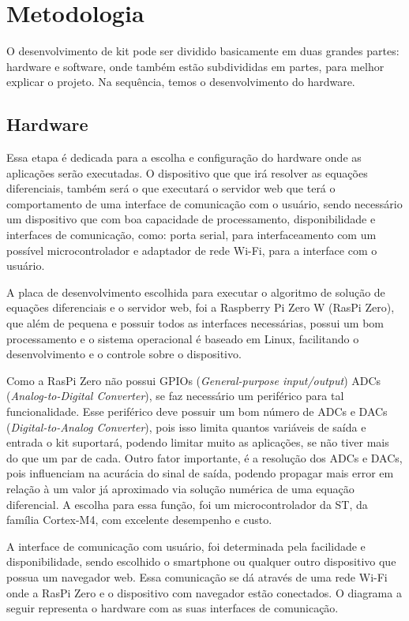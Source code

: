 \documentclass[journal]{IEEEtranTIE}
\begin{document}

\section{Metodologia}

O desenvolvimento de kit pode ser dividido basicamente em duas grandes partes: hardware e software, onde também estão subdivididas em partes, para melhor explicar o projeto. Na sequência, temos o desenvolvimento do hardware.

\subsection{Hardware}

Essa etapa é dedicada para a escolha e configuração do hardware onde as aplicações serão executadas. O dispositivo que que irá resolver as equações diferenciais, também será o que executará o servidor web que terá o comportamento de uma interface de comunicação com o usuário, sendo necessário um dispositivo que com boa capacidade de processamento, disponibilidade e interfaces de comunicação, como: porta serial, para interfaceamento com um possível microcontrolador e adaptador de rede Wi-Fi, para a interface com o usuário.

A placa de desenvolvimento escolhida para executar o algoritmo de solução de equações diferenciais e o servidor web, foi a Raspberry Pi Zero W (RasPi Zero), que além de pequena e possuir todos as interfaces necessárias, possui um bom processamento e o sistema operacional é baseado em Linux, facilitando o desenvolvimento e o controle sobre o dispositivo.

Como a RasPi Zero não possui GPIOs (\textit{General-purpose input/output}) ADCs (\textit{Analog-to-Digital Converter}), se faz necessário um periférico para tal funcionalidade. Esse periférico deve possuir um bom número de ADCs e DACs (\textit{Digital-to-Analog Converter}), pois isso limita quantos variáveis de saída e entrada o kit suportará, podendo limitar muito as aplicações, se não tiver mais do que um par de cada. Outro fator importante, é a resolução dos ADCs e DACs, pois influenciam na acurácia do sinal de saída, podendo propagar mais error em relação à um valor já aproximado via solução numérica de uma equação diferencial. A escolha para essa função, foi um microcontrolador da ST, da família Cortex-M4, com excelente desempenho e custo.

A interface de comunicação com usuário, foi determinada pela facilidade e disponibilidade, sendo escolhido o smartphone ou qualquer outro dispositivo que possua um navegador web. Essa comunicação se dá através de uma rede Wi-Fi onde a RasPi Zero e o dispositivo com navegador estão conectados. O diagrama a seguir representa o hardware com as suas interfaces de comunicação.
\end{document}
